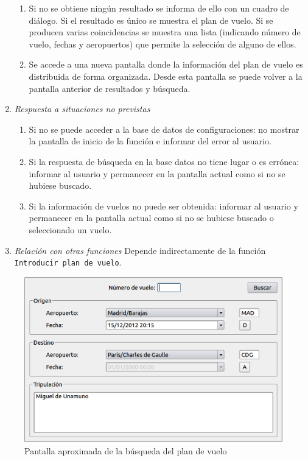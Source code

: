\begin{enumerate}
\begin{enumerate}
		\item Si no se obtiene ningún resultado se informa de ello con un cuadro de diálogo. Si el resultado es único se muestra el plan de vuelo. Si se producen varias coincidencias se muestra una lista (indicando número de vuelo, fechas y aeropuertos) que permite la selección de alguno de ellos.
		\item Se accede a una nueva pantalla donde la información del plan de vuelo es distribuida de forma organizada. Desde esta pantalla se puede volver a la pantalla anterior de resultados y búsqueda.
	\end{enumerate}
	\item \textit{Respuesta a situaciones no previstas}
	\begin{enumerate}
		\item Si no se puede acceder a la base de datos de configuraciones: no mostrar la pantalla de inicio de la función e informar del error al usuario.
		\item Si la respuesta de búsqueda en la base datos no tiene lugar o es errónea: informar al usuario y permanecer en la pantalla actual como si no se hubiese buscado.
		\item Si la información de vuelos no puede ser obtenida: informar al usuario y permanecer en la pantalla actual como si no se hubiese buscado o seleccionado un vuelo.
	\end{enumerate}
	\item \textit{Relación con otras funciones}
		Depende indirectamente de la función \verb|Introducir plan de vuelo|.
\end{enumerate}

\begin{figure}[ht]\centering
\includegraphics[scale=.6]{imagenes/BuscarPlanVuelo.png}
\caption{Pantalla aproximada de la búsqueda del plan de vuelo}
\end{figure}
